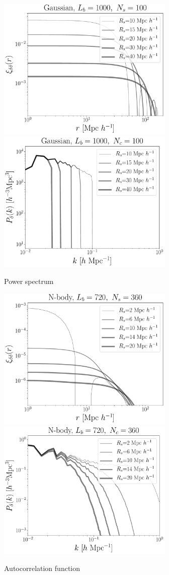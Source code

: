 \documentclass[usenatbib]{mnras}
\begin{document}
\begin{figure}
    \centering
    \includegraphics[width=240pt]{corr_func_gauss_1000_100.pdf}
    \includegraphics[width=240pt]{power_spectrum_gauss_1000_100.pdf}
    \caption{Power spectrum}
    \label{fig:power_spectrum}
\end{figure}

\begin{figure}
    \centering
    \includegraphics[width=240pt]{corr_func_nbody_720_360.pdf}
    \includegraphics[width=240pt]{power_spectrum_nbody_720_360.pdf}
    \caption{Autocorrelation function}
    \label{fig:autocorrelation}
\end{figure}
\end{document}
